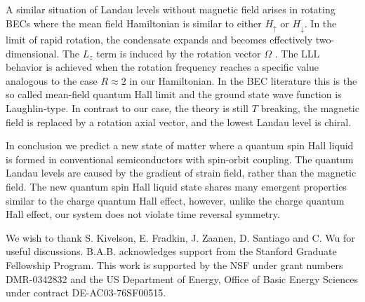 \documentclass[prl,aps,amssymb,shownopacs,twocolumn]{revtex4}
\begin{document}
A similar situation of Landau levels without magnetic field arises
in rotating BECs where the mean field Hamiltonian is similar to
either $H_\uparrow$ or $H_\downarrow$. In the limit of rapid
rotation, the condensate expands and becomes effectively
two-dimensional. The $L_z$ term is induced by the rotation vector
$\Omega$ \cite{ho2001}. The LLL behavior is achieved when the
rotation frequency reaches a specific value analogous to the case
$R\approx 2$ in our Hamiltonian. In the BEC literature this is the
so called mean-field quantum Hall limit and the ground state wave
function is Laughlin-type. In contrast to our case, the theory is
still $T$ breaking, the magnetic field is replaced by a rotation
axial vector, and the lowest Landau level is chiral.

In conclusion we predict a new state of matter where a quantum
spin Hall liquid is formed in conventional semiconductors with
spin-orbit coupling. The quantum Landau levels are caused by the
gradient of strain field, rather than the magnetic field. The new
quantum spin Hall liquid state shares many emergent properties
similar to the charge quantum Hall effect, however, unlike the
charge quantum Hall effect, our system does not violate time
reversal symmetry.


We wish to thank S. Kivelson, E. Fradkin, J. Zaanen, D. Santiago and
C. Wu for useful discussions. B.A.B. acknowledges support from the
Stanford Graduate Fellowship Program. This work is supported by the
NSF under grant numbers DMR-0342832 and the US Department of Energy,
Office of Basic Energy Sciences under contract DE-AC03-76SF00515.
\end{document}
